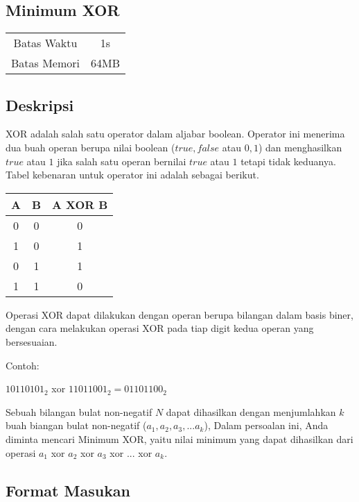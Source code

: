 \documentclass{article}
\begin{document}
\begin{center}
    \section*{Minimum XOR} %

    \begin{tabular}{ | c c | }
        \hline
        Batas Waktu  & 1s \\    %
        Batas Memori & 64MB \\  %
        \hline
    \end{tabular}
\end{center}

\subsection*{Deskripsi}

XOR adalah salah satu operator dalam aljabar boolean. Operator ini menerima dua buah operan berupa nilai boolean ($true, false$ 
atau $0, 1$) dan menghasilkan $true$ atau $1$ jika salah satu operan bernilai $true$ atau $1$ tetapi tidak keduanya. 
Tabel kebenaran untuk operator ini adalah sebagai berikut.

\begin{center}
\begin{tabular}{c|c|c}
A & B & A XOR B \\ \hline
0 & 0 & 0       \\
1 & 0 & 1       \\
0 & 1 & 1       \\
1 & 1 & 0
\end{tabular}
\end{center}
Operasi XOR dapat dilakukan dengan operan berupa bilangan dalam basis biner,
 dengan cara melakukan operasi XOR pada tiap digit kedua operan yang bersesuaian.

Contoh:
\begin{center}
$10110101_2$ xor $11011001_2 = 01101100_2$
\end{center}

Sebuah bilangan bulat non-negatif $N$ dapat dihasilkan dengan menjumlahkan $k$ buah biangan bulat non-negatif ($a_1, a_2, a_3, ... a_k$), 
Dalam persoalan ini, Anda diminta mencari Minimum XOR, yaitu nilai minimum yang dapat dihasilkan dari operasi  $a_1$ xor $a_2$ xor $a_3$ xor $...$ xor $a_k$.

\subsection*{Format Masukan}
\end{document}
